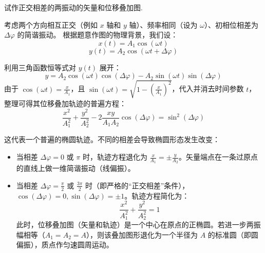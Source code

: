 \begin{exercise}\label{ex:2.11}
试作正交相差的两振动的矢量和位移叠加图.
\end{exercise}
\begin{solution}
考虑两个方向相互正交（例如 $x$ 轴和 $y$ 轴）、频率相同（设为 $\omega$）、初相位相差为 $\Delta\varphi$ 的简谐振动。
根据题意作图的物理背景，我们设：
$$ x(t) = A_1 \cos(\omega t) $$
$$ y(t) = A_2 \cos(\omega t + \Delta\varphi) $$

利用三角函数恒等式对 $y(t)$ 展开：
$$ y = A_2 \cos(\omega t) \cos(\Delta\varphi) - A_2 \sin(\omega t) \sin(\Delta\varphi) $$
由于 $\cos(\omega t) = \frac{x}{A_1}$，且 $\sin(\omega t) = \sqrt{1 - \left(\frac{x}{A_1}\right)^2}$，代入并消去时间参数 $t$，整理可得其位移叠加轨迹的普遍方程：
$$ \frac{x^2}{A_1^2} + \frac{y^2}{A_2^2} - 2\frac{x y}{A_1 A_2}\cos(\Delta\varphi) = \sin^2(\Delta\varphi) $$

这代表一个普遍的椭圆轨迹。不同的相差会导致椭圆形态发生改变：
\begin{itemize}
    \item 当相差 $\Delta\varphi = 0$ 或 $\pi$ 时，轨迹方程退化为 $\frac{x}{A_1} = \pm \frac{y}{A_2}$。矢量端点在一条过原点的直线上做一维简谐振动（线偏振）。
    \item 当相差 $\Delta\varphi = \frac{\pi}{2}$ 或 $\frac{3\pi}{2}$ 时（即严格的“正交相差”条件），$\cos(\Delta\varphi) = 0, \sin(\Delta\varphi) = \pm 1$。轨迹方程简化为：
    $$ \frac{x^2}{A_1^2} + \frac{y^2}{A_2^2} = 1 $$
    此时，位移叠加图（矢量和轨迹）是一个中心在原点的正椭圆。若进一步两振幅相等（$A_1 = A_2 = A$），则该叠加图形退化为一个半径为 $A$ 的标准圆（即圆偏振），质点作匀速圆周运动。
\end{itemize}
\end{solution}

